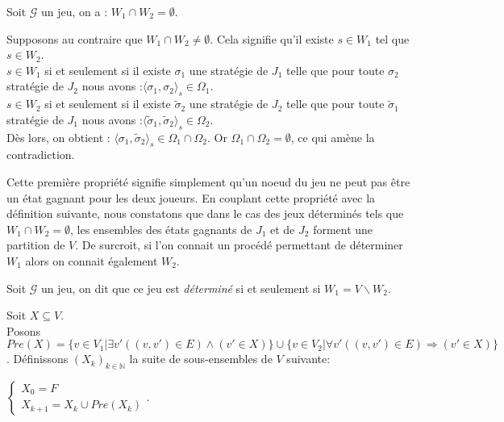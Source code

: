 	\begin{propriete}
		\label{Wempty}
		
		Soit $\mathcal{G}$ un jeu, on a : $W_{1}\cap W_{2} = \emptyset$.
	\end{propriete}
	\begin{demonstration}
		Supposons au contraire que $W_{1}\cap W_{2} \neq \emptyset$. Cela signifie qu'il existe $s \in W_{1}$ tel que $s \in W_{2}$.\\
		$s \in W_{1}$ si et seulement si il existe $\sigma _{1}$ une stratégie de $J_{1}$ telle que pour toute $\sigma _{2}$ stratégie de $J_{2}$ nous avons :$ \langle \sigma _{1},\sigma _{2} \rangle_s \in \Omega _{1}$.\\
		$s \in W_{2}$ si et seulement si il existe $\tilde{\sigma} _{2}$ une stratégie de $J_{2}$ telle que pour toute $\tilde{\sigma}_{1}$ stratégie de $J_{1}$ nous avons :$\langle \tilde{\sigma}_{1},\tilde{\sigma}_{2} \rangle_s \in \Omega _{2}$.\\
		Dès lors, on obtient : $\langle\sigma _{1},\tilde{\sigma}_{2}\rangle_s \in \Omega _{1} \cap \Omega _{2}$. Or $\Omega _{1} \cap \Omega _{2} = \emptyset$, ce qui amène la contradiction.\\
	\end{demonstration}

Cette première propriété signifie simplement qu'un noeud du jeu ne peut pas être un état gagnant pour les deux joueurs. En couplant cette propriété avec la définition suivante, nous constatons que dans le cas des jeux déterminés tels que $W_1 \cap W_2 = \emptyset$, les ensembles des états gagnants de $J_1$ et de $J_2$ forment une partition de $V$. De surcroit, si l'on connait un procédé permettant de déterminer $W_1$ alors on connait également $W_2$.

	\begin{defi}
		Soit $\mathcal{G}$ un jeu, on dit que ce jeu est \textit{déterminé} si et seulement si $W_{1} = V \backslash W_{2}$.
	\end{defi}

	\begin{defi}
		\label{def:predecesseur}
		 Soit $X \subseteq V$.\\ 
		Posons $Pre(X) = \{ v \in V_{1}| \exists v'((v,v')\in E) \wedge (v' \in X)\} \cup \{ v \in V_{2}|\forall v' ((v,v')\in E) \Rightarrow (v' \in X)\}$.
		Définissons $(X_{k})_{k \in \mathbb{N}}$ la suite de sous-ensembles de $V$ suivante: \\
		\begin{center}
			$
			  \begin{cases}
			   X_{0} = F \\
			   X_{k+1} = X_{k} \cup Pre(X_{k})
		       \end{cases}
			. $
		\end{center}
		
	\end{defi}
	
